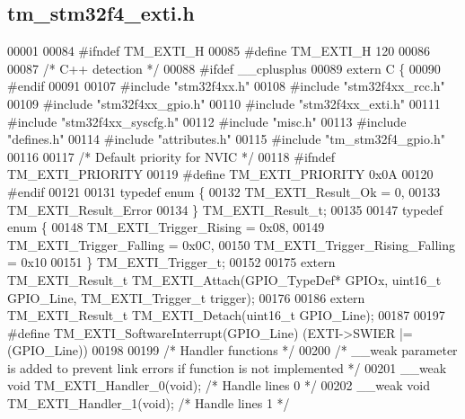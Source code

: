 \hypertarget{tm__stm32f4__exti_8h_source}{}\subsection{tm\+\_\+stm32f4\+\_\+exti.\+h}

\begin{DoxyCode}
00001 
00084 \textcolor{preprocessor}{#ifndef TM\_EXTI\_H}
00085 \textcolor{preprocessor}{#define TM\_EXTI\_H 120}
00086 
00087 \textcolor{comment}{/* C++ detection */}
00088 \textcolor{preprocessor}{#ifdef \_\_cplusplus}
00089 \textcolor{keyword}{extern} C \{
00090 \textcolor{preprocessor}{#endif}
00091 
00107 \textcolor{preprocessor}{#include "stm32f4xx.h"}
00108 \textcolor{preprocessor}{#include "stm32f4xx\_rcc.h"}
00109 \textcolor{preprocessor}{#include "stm32f4xx\_gpio.h"}
00110 \textcolor{preprocessor}{#include "stm32f4xx\_exti.h"}
00111 \textcolor{preprocessor}{#include "stm32f4xx\_syscfg.h"}
00112 \textcolor{preprocessor}{#include "misc.h"}
00113 \textcolor{preprocessor}{#include "defines.h"}
00114 \textcolor{preprocessor}{#include "attributes.h"}
00115 \textcolor{preprocessor}{#include "tm\_stm32f4\_gpio.h"}
00116 
00117 \textcolor{comment}{/* Default priority for NVIC */}
00118 \textcolor{preprocessor}{#ifndef TM\_EXTI\_PRIORITY}
00119 \textcolor{preprocessor}{#define TM\_EXTI\_PRIORITY    0x0A}
00120 \textcolor{preprocessor}{#endif}
00121 
00131 \textcolor{keyword}{typedef} \textcolor{keyword}{enum} \{
00132     TM\_EXTI\_Result\_Ok = 0,
00133     TM\_EXTI\_Result\_Error
00134 \} TM\_EXTI\_Result\_t;
00135 
00147 \textcolor{keyword}{typedef} \textcolor{keyword}{enum} \{
00148     TM\_EXTI\_Trigger\_Rising = 0x08,
00149     TM\_EXTI\_Trigger\_Falling = 0x0C,
00150     TM\_EXTI\_Trigger\_Rising\_Falling = 0x10
00151 \} TM\_EXTI\_Trigger\_t;
00152 
00175 \textcolor{keyword}{extern} TM\_EXTI\_Result\_t TM\_EXTI\_Attach(GPIO\_TypeDef* GPIOx, uint16\_t GPIO\_Line, TM\_EXTI\_Trigger\_t trigger);
00176 
00186 \textcolor{keyword}{extern} TM\_EXTI\_Result\_t TM\_EXTI\_Detach(uint16\_t GPIO\_Line);
00187 
00197 \textcolor{preprocessor}{#define TM\_EXTI\_SoftwareInterrupt(GPIO\_Line)    (EXTI->SWIER |= (GPIO\_Line))}
00198 
00199 \textcolor{comment}{/* Handler functions */}
00200 \textcolor{comment}{/* \_\_weak parameter is added to prevent link errors if function is not implemented */}
00201 \_\_weak \textcolor{keywordtype}{void} TM\_EXTI\_Handler\_0(\textcolor{keywordtype}{void});    \textcolor{comment}{/* Handle lines 0 */}
00202 \_\_weak \textcolor{keywordtype}{void} TM\_EXTI\_Handler\_1(\textcolor{keywordtype}{void});    \textcolor{comment}{/* Handle lines 1 */}

\end{DoxyCode}
